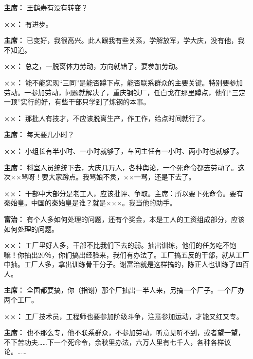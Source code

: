 \begin{list}{}
\item[\textbf{主席：}] 王鹤寿有没有转变？

\item[\textbf{××：}] 有进步。

\item[\textbf{主席：}] 已变好，我很高兴。此人跟我有些关系，学解放军，学大庆，没有他，我不知道。

\item[\textbf{××：}] 总之，一脱离体力劳动，方向就错了，要参加劳动。

\item[\textbf{××：}] 能不能实现“三同”是能否蹲下点，能否联系群众的主要关键。特别要参加劳动。一参加劳动，问题就解决了，重庆钢铁厂，任白戈在那里蹲点，他们“三定一顶”实行的好，有些干部只学到了炼钢的本事。

\item[\textbf{××：}] 那批人有技才，不应该脱离生产，作工作，给点时间就行了。

\item[\textbf{主席：}] 每天要几小时？

\item[\textbf{××：}] 小组长有半小时、一小时就够了，车间主任有一小时、两小时也就够了。

\item[\textbf{主席：}] 科室人员统统下去，大庆几万人，各种舆论，一个死命令都去劳动了。这次××骂呀！要大家蹲点。我骂娘不灵，××一骂，还是下去了。

\item[\textbf{××：}] 干部中大部分是老工人，应该批评、争取。主席：所以要下死命令。要有秦始皇。中国的秦始皇是谁？就是×××。我当他的助手。

\item[\textbf{富治：}] 有个人多如何处理的问题，还有个奖金，本是工人的工资组成部分，应该如何处理的问题。

\item[\textbf{××：}] 工厂里好人多，干部不比我们下去的弱。抽出训练，他们的任务吃不饱嘛！你抽出20％，你们搞出经验来，我们有办法了。工厂搞五反的干部，就从工厂中抽。工厂人多，拿出训练骨干分子。谢富治就是这样搞的，陈正人也训练了四百人。

\item[\textbf{主席：}] 全国都要搞，你（指谢）那个厂抽出一半人来，另搞一个厂子。一个厂办两个工厂。

\item[\textbf{××：}] 工厂技术员，工程师也要参加阶级斗争，注意参加运动，才能又红又专。

\item[\textbf{主席：}] 也不那么专，他不联系群众，不参加劳动，听意见听不到，或者望一望，不下苦功夫……下一个死命令，余秋里办法，六万人里有七千人，各种各样议论。……


\end{list}
